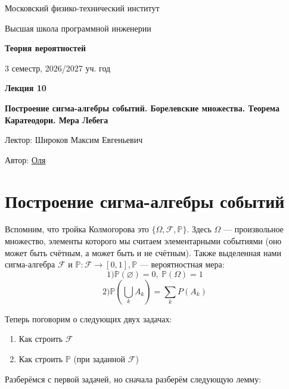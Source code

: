 \documentclass[11pt]{article}
\newcommand{\lectureNumber}{10}
\newcommand{\lectureTitle}{Построение сигма-алгебры событий. Борелевские множества. Теорема Каратеодори. Мера Лебега}
\newcommand{\courseName}{Теория вероятностей}
\newcommand{\semester}{3 семестр, 2026/2027 уч. год}
\begin{document}
\begin{titlepage}
    \centering
    
    {\large Московский физико-технический институт \par}
    {\large Высшая школа программной инженерии \par}
    \vspace{2cm}

    {\Large \textbf{\courseName} \par}
    {\large \semester \par}
    
    \vspace*{\fill}

    {\Huge \textbf{Лекция \lectureNumber} \par}
    {\Huge \textbf{\lectureTitle} \par}
    
    \vspace*{\fill}
    
    {\large Лектор: Широков Максим Евгеньевич  \par}
    {\large Автор: \href{https://t.me/mallina_olga}{Оля} \par}
\end{titlepage}


\section{Построение сигма-алгебры событий}
\begin{definition}
    Вспомним, что тройка Колмогорова это $\{ \Omega, \mathcal{F}, \mathbb{P} \}$. 
    Здесь $\Omega$ --- произвольное множество, элементы которого мы считаем элементарными событиями (оно может быть счётным, а может быть и не счётным).
    Также выделенная нами сигма-алгебра $\mathcal{F}$ и  $\mathbb{P} : \mathcal{F} \to [0,1], \mathbb{P}$ --- вероятностная мера:
    \[ 1) \mathbb{P}(\varnothing) = 0, \ \mathbb{P}(\Omega) = 1  \]
    \[ 2) \mathbb{P} ( \bigcup_k A_k) = \sum_{k} P(A_k) \] 
\end{definition}

Теперь поговорим о следующих двух задачах:
\begin{enumerate}
    \item Как строить $\mathcal{F}$
    \item Как строить $\mathbb{P}$ (при заданной $\mathcal{F}$)
\end{enumerate}
Разберёмся с первой задачей, но сначала разберём следующую лемму:
\end{document}
